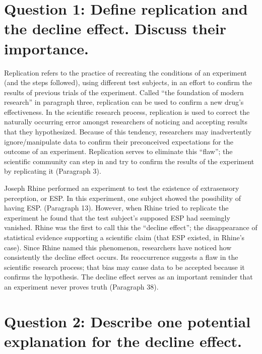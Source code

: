 \section{\textbf{Question 1: Define replication and the decline effect.
Discuss their
importance.}}\label{question-1-define-replication-and-the-decline-effect.-discuss-their-importance.}

Replication refers to the practice of recreating the conditions of an
experiment (and the steps followed), using different test subjects, in
an effort to confirm the results of previous trials of the experiment.
Called ``the foundation of modern research'' in paragraph three,
replication can be used to confirm a new drug's effectiveness. In the
scientific research process, replication is used to correct the
naturally occurring error amongst researchers of noticing and accepting
results that they hypothesized. Because of this tendency, researchers
may inadvertently ignore/manipulate data to confirm their preconceived
expectations for the outcome of an experiment. Replication serves to
eliminate this ``flaw''; the scientific community can step in and try to
confirm the results of the experiment by replicating it (Paragraph 3).

Joseph Rhine performed an experiment to test the existence of
extrasensory perception, or ESP. In this experiment, one subject showed
the possibility of having ESP. (Paragraph 13). However, when Rhine tried
to replicate the experiment he found that the test subject's supposed
ESP had seemingly vanished. Rhine was the first to call this the
``decline effect''; the disappearance of statistical evidence supporting
a scientific claim (that ESP existed, in Rhine's case). Since Rhine
named this phenomenon, researchers have noticed how consistently the
decline effect occurs. Its reoccurrence suggests a flaw in the
scientific research process; that bias may cause data to be accepted
because it confirms the hypothesis. The decline effect serves as an
important reminder that an experiment never proves truth (Paragraph 38).

\section{\textbf{Question 2: Describe one potential explanation for the
decline
effect.}}\label{question-2-describe-one-potential-explanation-for-the-decline-effect.}

